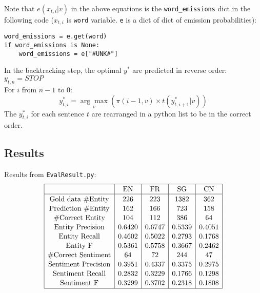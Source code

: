 \documentclass[12pt]{article}
\begin{document}
Note that \(e(x_{t,i}|v)\) in the above equations is the \verb|word_emissions| dict in the following code (\(x_{t,i}\) is \verb|word| variable. \verb|e| is a dict of dict of emission probabilities):
\begin{verbatim}
word_emissions = e.get(word)
if word_emissions is None:
    word_emissions = e["#UNK#"]
\end{verbatim}

In the backtracking step, the optimal \(y^*\) are predicted in reverse order:\\
\(y_{t,n} = STOP\) \\
For \(i\) from \(n-1\) to 0:
\[y_{t,i}^* = \underset{v}{\arg\max} \left( \pi(i-1,v) \times t(y_{t,i+1}^*|v) \right)\]
The \(y_{t,i}^*\) for each sentence \(t\) are rearranged in a python list to be in the correct order.

\subsection{Results}
Results from \verb|EvalResult.py|:
\[
\begin{array}{|c|c|c|c|c|}
\hline \rule{0pt}{1em}
& \mbox{EN} & \mbox{FR} & \mbox{SG} & \mbox{CN} \\
\hline \rule{0pt}{1em}
\mbox{Gold data \#Entity} & 226    & 223    & 1382   & 362    \\[0.1em]
\mbox{Prediction \#Entity}& 162    & 166    & 723    & 158    \\[0.1em]
\mbox{\#Correct Entity}   & 104    & 112    & 386    & 64     \\[0.1em]
\mbox{Entity Precision}   & 0.6420 & 0.6747 & 0.5339 & 0.4051 \\[0.1em]
\mbox{Entity Recall}      & 0.4602 & 0.5022 & 0.2793 & 0.1768 \\[0.1em]
\mbox{Entity F}           & 0.5361 & 0.5758 & 0.3667 & 0.2462 \\[0.1em]
\mbox{\#Correct Sentiment}& 64     & 72     & 244    & 47     \\[0.1em]
\mbox{Sentiment Precision}& 0.3951 & 0.4337 & 0.3375 & 0.2975 \\[0.1em]
\mbox{Sentiment Recall}   & 0.2832 & 0.3229 & 0.1766 & 0.1298 \\[0.1em]
\mbox{Sentiment F}        & 0.3299 & 0.3702 & 0.2318 & 0.1808 \\[0.1em] 
\hline
\end{array}
\]



\pagebreak
\end{document}
